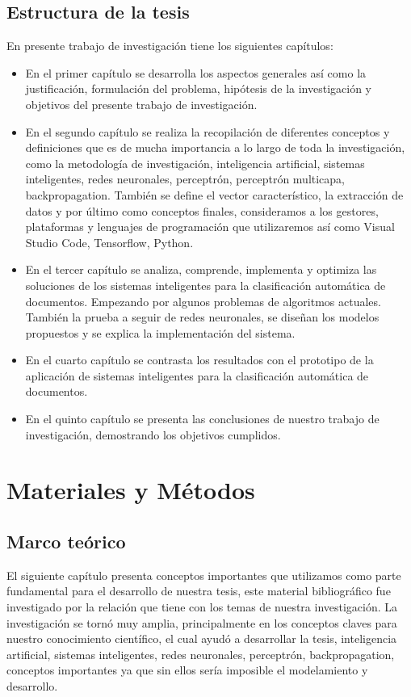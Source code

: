 \section{Estructura de la tesis}

En presente trabajo de investigación tiene los siguientes capítulos:

\begin{itemize}
 \item En el primer capítulo se desarrolla los aspectos generales así como la justificación, formulación del problema, hipótesis de la investigación y  objetivos del presente trabajo de investigación.
 \item En el segundo capítulo se realiza la recopilación de diferentes conceptos y definiciones que es de mucha importancia a lo largo de toda la investigación, como la metodología de investigación, inteligencia artificial, sistemas inteligentes, redes neuronales, perceptrón, perceptrón multicapa, backpropagation. También se define el vector característico, la extracción de datos y por último como conceptos finales, consideramos a los gestores, plataformas y lenguajes de programación que utilizaremos así como Visual Studio Code, Tensorflow, Python.
 \item En el tercer capítulo se analiza, comprende, implementa  y optimiza las soluciones de los sistemas inteligentes para la clasificación automática de documentos. Empezando por algunos problemas de algoritmos actuales. También la prueba a seguir de redes neuronales, se diseñan los modelos propuestos y se explica la implementación del sistema.
 \item En el cuarto capítulo se contrasta los resultados con el prototipo de la aplicación de sistemas inteligentes para la clasificación automática de documentos.
 \item En el quinto capítulo se presenta las conclusiones de nuestro trabajo de investigación, demostrando los objetivos cumplidos.
\end{itemize}




\chapter{Materiales y Métodos}
\renewcommand{\baselinestretch}{2} %

\section{Marco teórico}
El siguiente capítulo presenta conceptos importantes que utilizamos como parte fundamental para el desarrollo de nuestra tesis, este material bibliográfico fue investigado por la relación que tiene con los temas de nuestra investigación. La investigación se tornó muy amplia, principalmente en los conceptos claves para nuestro conocimiento científico, el cual ayudó a desarrollar la tesis, inteligencia artificial, sistemas inteligentes, redes neuronales, perceptrón, backpropagation, conceptos importantes ya que sin ellos sería imposible el modelamiento y desarrollo.

